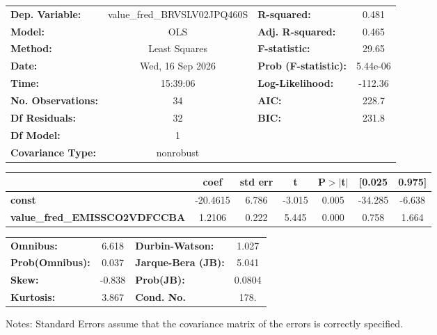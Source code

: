 \begin{center}
\begin{tabular}{lclc}
\toprule
\textbf{Dep. Variable:}               & value\_fred\_BRVSLV02JPQ460S & \textbf{  R-squared:         } &     0.481   \\
\textbf{Model:}                       &             OLS              & \textbf{  Adj. R-squared:    } &     0.465   \\
\textbf{Method:}                      &        Least Squares         & \textbf{  F-statistic:       } &     29.65   \\
\textbf{Date:}                        &       Wed, 16 Sep 2026       & \textbf{  Prob (F-statistic):} &  5.44e-06   \\
\textbf{Time:}                        &           15:39:06           & \textbf{  Log-Likelihood:    } &   -112.36   \\
\textbf{No. Observations:}            &                34            & \textbf{  AIC:               } &     228.7   \\
\textbf{Df Residuals:}                &                32            & \textbf{  BIC:               } &     231.8   \\
\textbf{Df Model:}                    &                 1            & \textbf{                     } &             \\
\textbf{Covariance Type:}             &          nonrobust           & \textbf{                     } &             \\
\bottomrule
\end{tabular}
\begin{tabular}{lcccccc}
                                      & \textbf{coef} & \textbf{std err} & \textbf{t} & \textbf{P$> |$t$|$} & \textbf{[0.025} & \textbf{0.975]}  \\
\midrule
\textbf{const}                        &     -20.4615  &        6.786     &    -3.015  &         0.005        &      -34.285    &       -6.638     \\
\textbf{value\_fred\_EMISSCO2VDFCCBA} &       1.2106  &        0.222     &     5.445  &         0.000        &        0.758    &        1.664     \\
\bottomrule
\end{tabular}
\begin{tabular}{lclc}
\textbf{Omnibus:}       &  6.618 & \textbf{  Durbin-Watson:     } &    1.027  \\
\textbf{Prob(Omnibus):} &  0.037 & \textbf{  Jarque-Bera (JB):  } &    5.041  \\
\textbf{Skew:}          & -0.838 & \textbf{  Prob(JB):          } &   0.0804  \\
\textbf{Kurtosis:}      &  3.867 & \textbf{  Cond. No.          } &     178.  \\
\bottomrule
\end{tabular}
\end{center}

Notes: \newline
 [1] Standard Errors assume that the covariance matrix of the errors is correctly specified.